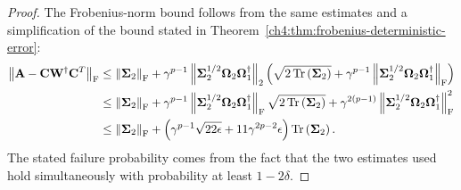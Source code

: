 \begin{proof}
The Frobenius-norm bound follows from the same estimates and a
simplification of the bound stated in
 Theorem~\ref{ch4:thm:frobenius-deterministic-error}:
\begin{align*}
\left\|\mathbf{A} - \mathbf{C} \mathbf{W}^\dagger \mathbf{C}^T\right\|_\mathrm{F} & \leq \left\|\mathbf{\Sigma}_2\right\|_\mathrm{F} 
  +  \gamma^{p-1} \left\|\mathbf{\Sigma}_2^{1/2} \mathbf{\Omega}_2 \mathbf{\Omega}_1^\dagger\right\|_2
                  \left( 
                       \sqrt{ 2 \operatorname{Tr}\left(\mathbf{\Sigma}_2\right) } 
                       + \gamma^{p-1} 
                       \left\|\mathbf{\Sigma}_2^{1/2} \mathbf{\Omega}_2 \mathbf{\Omega}_1^\dagger\right\|_\mathrm{F} 
                   \right) \\
  & \leq   \left\|\mathbf{\Sigma}_2\right\|_\mathrm{F} 
  +  \gamma^{p-1} \left\|\mathbf{\Sigma}_2^{1/2} \mathbf{\Omega}_2 \mathbf{\Omega}_1^\dagger\right\|_\mathrm{F}
     \sqrt{ 2 \operatorname{Tr}\left(\mathbf{\Sigma}_2\right) } 
  + \gamma^{2(p-1)} \left\|\mathbf{\Sigma}_2^{1/2} \mathbf{\Omega}_2 \mathbf{\Omega}_1^\dagger\right\|_\mathrm{F}^2 \\
  & \leq \left\|\mathbf{\Sigma}_2\right\|_\mathrm{F}
  + \left( \gamma^{p-1} \sqrt{22 \epsilon} 
           + 11 \gamma^{2p-2} \epsilon \right) \operatorname{Tr}\left(\mathbf{\Sigma}_2\right). 
\end{align*}
The stated failure probability comes from the fact that the two estimates used hold simultaneously
with probability at least $1 - 2\delta.$
\end{proof}

